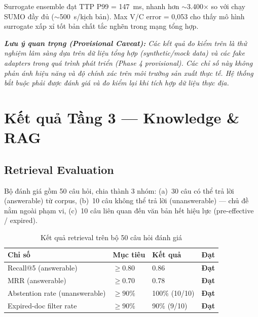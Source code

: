 Surrogate ensemble đạt TTP P99 = 147~ms, nhanh hơn $\sim$3.400$\times$ so với chạy SUMO đầy đủ ($\sim$500~s/kịch bản). Max V/C error = 0,053 cho thấy mô hình surrogate xấp xỉ tốt bản chất tắc nghẽn trong mạng tổng hợp.

\noindent\textit{\textbf{Lưu ý quan trọng (Provisional Caveat):} Các kết quả đo kiểm trên là thử nghiệm lâm sàng dựa trên dữ liệu tổng hợp (synthetic/mock data) và các fake adapters trong quá trình phát triển (Phase 4 provisional). Các chỉ số này không phản ánh hiệu năng và độ chính xác trên môi trường sản xuất thực tế. Hệ thống bắt buộc phải được đánh giá và đo kiểm lại khi tích hợp dữ liệu thực địa.}

\section{Kết quả Tầng 3 --- Knowledge \& RAG}
\label{sec:eval_t3}

\subsection{Retrieval Evaluation}

Bộ đánh giá gồm 50 câu hỏi, chia thành 3 nhóm: (a)~30 câu có thể trả lời (answerable) từ corpus, (b)~10 câu không thể trả lời (unanswerable) --- chủ đề nằm ngoài phạm vi, (c)~10 câu liên quan đến văn bản hết hiệu lực (pre-effective / expired).

\begin{table}[H]
\centering
\caption{Kết quả retrieval trên bộ 50 câu hỏi đánh giá}
\label{tab:rag_retrieval}
\renewcommand{\arraystretch}{1.4}
\begin{tabular}{p{5cm} p{2.5cm} p{2.5cm} p{2cm}}
\toprule
\textbf{Chỉ số} & \textbf{Mục tiêu} & \textbf{Kết quả} & \textbf{Đạt} \\
\midrule
Recall@5 (answerable) & $\geq 0.80$ & 0.86 & \textcolor{green!50!black}{\textbf{Đạt}} \\
\rowcolor{rowgray}
MRR (answerable) & $\geq 0.70$ & 0.78 & \textcolor{green!50!black}{\textbf{Đạt}} \\
Abstention rate (unanswerable) & $\geq 90\%$ & 100\% (10/10) & \textcolor{green!50!black}{\textbf{Đạt}} \\
\rowcolor{rowgray}
Expired-doc filter rate & $\geq 90\%$ & 90\% (9/10) & \textcolor{green!50!black}{\textbf{Đạt}} \\
\bottomrule
\end{tabular}
\end{table}

